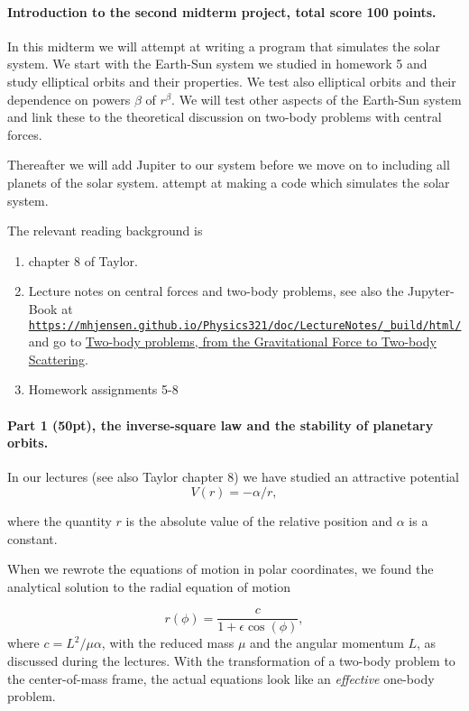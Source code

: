 \documentclass[%
oneside,                 %
final,                   %
10pt]{article}
\begin{document}
\noindent
\paragraph{Introduction to the second midterm project, total score 100 points.}
In this midterm we will attempt at writing a program that simulates
the solar system. We start with the Earth-Sun system we studied in
homework 5  and study elliptical orbits and their properties. We test
also elliptical orbits and their dependence on powers $\beta$ of
$r^{\beta}$. We will test other aspects of the Earth-Sun system and
link these to the theoretical discussion on two-body problems with
central forces. 

Thereafter we will add Jupiter to our system before we move on to including all planets of the solar system.
attempt at making a code which simulates the solar system.

The relevant reading background is
\begin{enumerate}
\item chapter 8 of  Taylor.

\item Lecture notes on central forces and two-body problems, see also the Jupyter-Book at \href{{https://mhjensen.github.io/Physics321/doc/LectureNotes/_build/html/}}{\nolinkurl{https://mhjensen.github.io/Physics321/doc/LectureNotes/_build/html/}} and go to \href{{https://mhjensen.github.io/Physics321/doc/LectureNotes/_build/html/chapter6.html}}{Two-body problems, from the Gravitational Force to Two-body Scattering}.

\item Homework assignments  5-8
\end{enumerate}

\noindent
\paragraph{Part 1 (50pt), the inverse-square law and the stability of planetary orbits.}
In our lectures (see also Taylor chapter 8)  we have studied an attractive potential
\[
V(r)=-\alpha/r,
\]

where the quantity $r$ is the absolute value of the relative position
and $\alpha$ is a constant.

When we rewrote the equations of motion in polar coordinates, we found the
analytical solution to the radial equation of motion 

\[
r(\phi) = \frac{c}{1+\epsilon\cos{(\phi)}},
\]
where $c=L^2/\mu\alpha$, with
the reduced mass $\mu$ and the angular momentum $L$, as
discussed during the lectures. With the transformation of a two-body
problem to the center-of-mass frame, the actual equations look like an
\emph{effective} one-body problem. 
\end{document}
